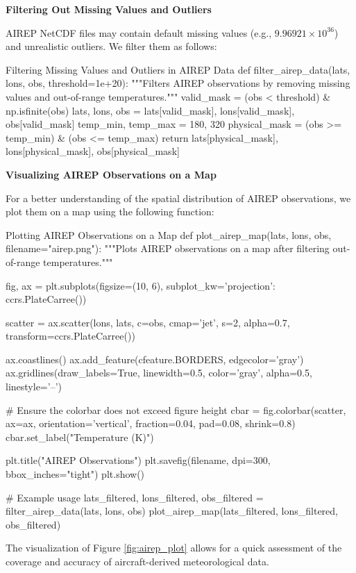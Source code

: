 \textbf{Filtering Out Missing Values and Outliers}

AIREP NetCDF files may contain default missing values (e.g., $9.96921\times10^{36}$) and unrealistic outliers. We filter them as follows:

\begin{codeonly}{Filtering Missing Values and Outliers in AIREP Data}
def filter_airep_data(lats, lons, obs, threshold=1e+20):
    """Filters AIREP observations by removing missing values and out-of-range temperatures."""
    valid_mask = (obs < threshold) & np.isfinite(obs)
    lats, lons, obs = lats[valid_mask], lons[valid_mask], obs[valid_mask]
    temp_min, temp_max = 180, 320
    physical_mask = (obs >= temp_min) & (obs <= temp_max)
    return lats[physical_mask], lons[physical_mask], obs[physical_mask]
\end{codeonly}

\textbf{Visualizing AIREP Observations on a Map}

For a better understanding of the spatial distribution of AIREP observations, we plot them on a map using the following function:

\begin{codeonly}{Plotting AIREP Observations on a Map}
def plot_airep_map(lats, lons, obs, filename="airep.png"):
    """Plots AIREP observations on a map after filtering out-of-range temperatures."""

    fig, ax = plt.subplots(figsize=(10, 6), subplot_kw={'projection': ccrs.PlateCarree()})

    scatter = ax.scatter(lons, lats, c=obs, cmap='jet', s=2, alpha=0.7, transform=ccrs.PlateCarree())

    ax.coastlines()
    ax.add_feature(cfeature.BORDERS, edgecolor='gray')
    ax.gridlines(draw_labels=True, linewidth=0.5, color='gray', alpha=0.5, linestyle='--')

    # Ensure the colorbar does not exceed figure height
    cbar = fig.colorbar(scatter, ax=ax, orientation='vertical', fraction=0.04, pad=0.08, shrink=0.8)
    cbar.set_label("Temperature (K)")

    plt.title("AIREP Observations")
    plt.savefig(filename, dpi=300, bbox_inches="tight")
    plt.show()

# Example usage
lats_filtered, lons_filtered, obs_filtered = filter_airep_data(lats, lons, obs)
plot_airep_map(lats_filtered, lons_filtered, obs_filtered)
\end{codeonly}


The visualization of Figure \ref{fig:airep_plot} allows for a quick assessment of the coverage and accuracy of aircraft-derived meteorological data.

